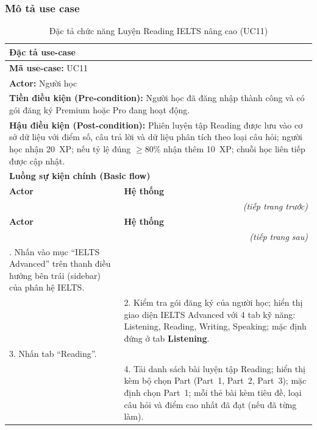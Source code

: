 \subsubsection{Mô tả use case}
\renewcommand{\arraystretch}{1.3}
\setlength{\tbu}{\dimexpr(\linewidth - 4\tabcolsep - 3\arrayrulewidth)/2\relax}
\begin{longtable}{|p{\tbu}|p{\tbu}|}
    \caption{Đặc tả chức năng Luyện Reading IELTS nâng cao (UC11)} \label{tab:uc11_spec} \\
    
    \hline
    \multicolumn{2}{|l|}{\textbf{Đặc tả use-case}} \\ \hline
    \multicolumn{2}{|l|}{\textbf{Mã use-case:} UC11} \\ \hline
    \multicolumn{2}{|l|}{\textbf{Actor:} Người học} \\ \hline
    \multicolumn{2}{|p{\dimexpr\linewidth - 2\tabcolsep - 2\arrayrulewidth\relax}|}{\textbf{Tiền điều kiện (Pre-condition):} Người học đã đăng nhập thành công và có gói đăng ký Premium hoặc Pro đang hoạt động.} \\ \hline
    \multicolumn{2}{|p{\dimexpr\linewidth - 2\tabcolsep - 2\arrayrulewidth\relax}|}{\textbf{Hậu điều kiện (Post-condition):} Phiên luyện tập Reading được lưu vào cơ sở dữ liệu với điểm số, câu trả lời và dữ liệu phân tích theo loại câu hỏi; người học nhận 20~XP; nếu tỷ lệ đúng $\geq 80\%$ nhận thêm 10~XP; chuỗi học liên tiếp được cập nhật.} \\ \hline
    \multicolumn{2}{|l|}{\textbf{Luồng sự kiện chính (Basic flow)}} \\ \hline
    \textbf{Actor} & \textbf{Hệ thống} \\ \hline
    \endfirsthead
    \multicolumn{2}{r}{\textit{(tiếp trang trước)}} \\
    \hline
    \textbf{Actor} & \textbf{Hệ thống} \\ \hline
    \endhead
    \hline
    \multicolumn{2}{r}{\textit{(tiếp trang sau)}} \\
    \endfoot
    \endlastfoot
    1. Nhấn vào mục ``IELTS Advanced'' trên thanh điều hướng bên trái (sidebar) của phân hệ IELTS. & \\ \hline
    & 2. Kiểm tra gói đăng ký của người học; hiển thị giao diện IELTS Advanced với 4 tab kỹ năng: Listening, Reading, Writing, Speaking; mặc định đứng ở tab \textbf{Listening}. \\ \hline
    3. Nhấn tab ``Reading''. & \\ \hline
    & 4. Tải danh sách bài luyện tập Reading; hiển thị kèm bộ chọn Part (Part~1, Part~2, Part~3); mặc định chọn Part~1; mỗi thẻ bài kèm tiêu đề, loại câu hỏi và điểm cao nhất đã đạt (nếu đã từng làm). \\ \hline

\end{longtable}
